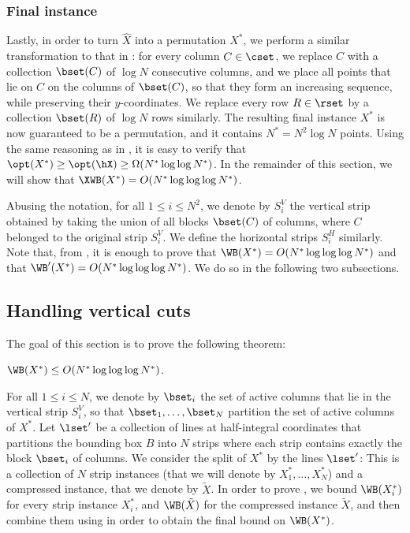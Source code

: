 \documentclass{toc}
\begin{document}
\subsubsection{Final instance}


Lastly, in order to turn $\hat X$ into a permutation $X^*$, we perform a similar transformation to that in : for every column $C\in \cset$, we replace $C$ with a collection $\bset(C)$ of $\log N$ consecutive columns, and we place all points that lie on $C$ on the columns of $\bset(C)$, so that they form an increasing sequence, while preserving their $y$-coordinates. We replace every row $R\in \rset$ by a collection $\bset(R)$ of $\log N$ rows similarly. The resulting final instance $X^*$ is now guaranteed to be a permutation, and it contains $N^*=N^2\log N$ points. Using the same reasoning as in , it is easy to verify that $\opt(X^*)\geq \opt(\hX)\geq \Omega(N^*\log\log N^*)$. In the remainder of this section, we will show that $\XWB(X^*)=O(N^*\log\log \log N^*)$. 

Abusing the notation, for all $1\leq i\leq N^2$, we denote by $S^V_i$ the vertical strip obtained by taking the union of all blocks $\bset(C)$ of columns, where $C$ belonged to the original strip $S^V_i$. We define the horizontal strips $S^H_i$ similarly. Note that, from , it is enough to prove that $\WB(X^*)=O(N^*\log\log \log N^*)$ and that  $\WB'(X^*)=O(N^*\log\log \log N^*)$. We do so in the following two subsections.


%
%
%
%
\subsection{Handling vertical cuts}\label{subsec: bounding WB vertical}
%
%
%
%
The goal of this section is to prove the following theorem:

\begin{theorem}\label{thm: boundinb WB vertical}
	$\WB(X^*)\leq O(N^*\log\log\log N^*)$.
\end{theorem}

For all $1\leq i\leq N$, we denote by $\bset_i$ the set of active columns that lie in the vertical strip $S^V_i$, so that $\bset_1,\ldots,\bset_N$ partition the set of active columns of $X^*$.
Let $\lset'$ be a collection of lines at half-integral coordinates that partitions the bounding box $B$ into $N$ strips where each strip contains exactly the block $\bset_i$ of columns. 
We consider the split of $X^*$ by the lines $\lset'$: This is a collection of $N$ strip instances (that we will denote by $X^*_1,\ldots,X^*_N$) and a compressed instance, that we denote by $\tilde X$.     
%
%
In order to prove , we bound $\WB(X^*_i)$ for every strip instance $X^*_i$, and $\WB(\tilde X)$ for the compressed instance $\tilde X$, and then combine them using  in order to obtain the final bound on $\WB(X^*)$.
\end{document}
